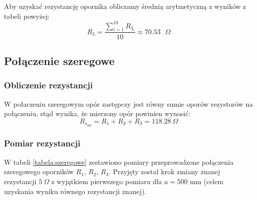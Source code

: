 \documentclass[a4paper,12pts]{article}
\begin{document}
\begin{table}[!h]
	\centering
	\caption{Wyniki pomiarów dla opornika nr 3}
	\label{tabela:opornik3}
\end{table}

Aby uzyskać rezystancję opornika obliczamy średnią arytmetyczną z wyników z tabeli powyżej:
\begin{equation}
\overline{R_3} = \frac{\sum_{i = 1}^{10} R_{3_i}}{10} \approx 70.53 \textrm{ $\Omega$}
\end{equation}


\subsection{Połączenie szeregowe}
\subsubsection{Obliczenie rezystancji}
W połaczeniu szeregowym opór zastępczy jest równy sumie oporów rezystorów na połączeniu, stąd wynika, że mierzony opór powinien wynosić:
\begin{equation}
R_{s_{obl}} = R_1 + R_2 + R_3 = 118.28~\Omega
\end{equation}

\subsubsection{Pomiar rezystancji}
W tabeli \ref{tabela:szeregowe} zestawiono pomiary przeprowadzone połączenia szeregowego oporników $R_1$, $R_2$, $R_3$. Przyjęty został krok zmiany znanej rezystancji $5 ~\Omega$ z wyjątkiem pierwszego pomiaru dla $a = 500$ mm (celem uzyskania wyniku równego rezystancji znanej).
\end{document}

